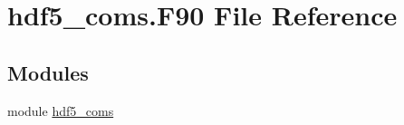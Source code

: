 \hypertarget{memory_2hdf5__coms_8_f90}{}\section{hdf5\+\_\+coms.\+F90 File Reference}
\label{memory_2hdf5__coms_8_f90}
\subsection*{Modules}
\begin{DoxyCompactItemize}
\item 
module \hyperlink{namespacehdf5__coms}{hdf5\+\_\+coms}
\end{DoxyCompactItemize}
